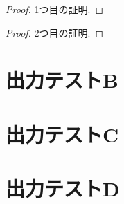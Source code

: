 \documentclass[uplatex, dvipdfmx, a4paper, 12pt, class=jsbook, crop=false]{standalone}
\begin{document}
\begin{corollary}
	\label{cor:test-corollary-B}
	\lipsum[1][2]
\end{corollary}

\begin{proposition}
	\label{prop:test-prop-A}
	\lipsum[1][2]
\end{proposition}

\begin{proof}
	\label{pf:test-proof-A}
	1つ目の証明.
\end{proof}

\begin{proof}
	\label{pf:test-proof-B}
	2つ目の証明.
\end{proof}

\begin{problem}
	\label{prob:test-problem-A}
	\lipsum[1][2]
\end{problem}

\section{出力テストB}
\label{sec:test-B}
\lipsum[2-3]

\section{出力テストC}
\label{sec:test-C}
\lipsum[4][1]

\section{出力テストD}
\label{sec:test-D}
\lipsum[4][1-3]
\end{document}
